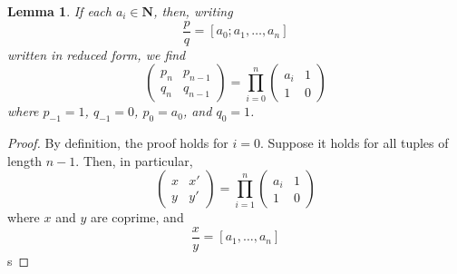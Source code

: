 \documentclass[12pt]{report}
\theoremstyle{plain}
\newtheorem{lemma}[theorem]{Lemma}
\theoremstyle{definition}
\begin{document}
\begin{lemma}
    If each $a_i \in \mathbf{N}$, then, writing
    \[ \frac{p}{q} = [a_0; a_1, \dots, a_n] \]
    written in reduced form, we find
    \[ \begin{pmatrix} p_n & p_{n-1} \\ q_n & q_{n-1} \end{pmatrix} = \prod_{i = 0}^n \begin{pmatrix} a_i & 1 \\ 1 & 0 \end{pmatrix} \]
    where $p_{-1} = 1$, $q_{-1} = 0$, $p_0 = a_0$, and $q_0 = 1$.
\end{lemma}
\begin{proof}
    By definition, the proof holds for $i = 0$. Suppose it holds for all tuples of length $n-1$. Then, in particular,
    \[ \begin{pmatrix} x & x' \\ y & y' \end{pmatrix} = \prod_{i = 1}^n \begin{pmatrix} a_i & 1 \\ 1 & 0 \end{pmatrix} \]
    where $x$ and $y$ are coprime, and
    \[ \frac{x}{y} = [a_1, \dots, a_n] \]
    s
\end{proof}
\end{document}
